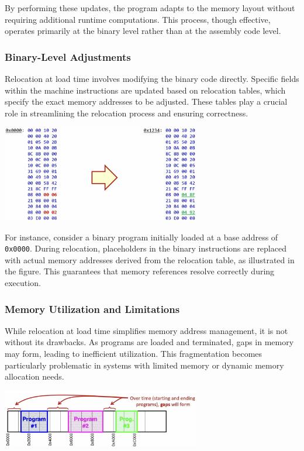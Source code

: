 By performing these updates, the program adapts to the memory layout without requiring additional runtime computations. This process, though effective, operates primarily at the binary level rather than at the assembly code level.

\subsubsection{Binary-Level Adjustments}

Relocation at load time involves modifying the binary code directly. Specific fields within the machine instructions are updated based on relocation tables, which specify the exact memory addresses to be adjusted. These tables play a crucial role in streamlining the relocation process and ensuring correctness.
\begin{center}
    \includegraphics[width=0.65\textwidth]{chapters/chapter3c/images/relocate2.png}
\end{center}

For instance, consider a binary program initially loaded at a base address of \texttt{0x0000}. During relocation, placeholders in the binary instructions are replaced with actual memory addresses derived from the relocation table, as illustrated in the figure. This guarantees that memory references resolve correctly during execution.

\subsubsection{Memory Utilization and Limitations}

While relocation at load time simplifies memory address management, it is not without its drawbacks. As programs are loaded and terminated, gaps in memory may form, leading to inefficient utilization. This fragmentation becomes particularly problematic in systems with limited memory or dynamic memory allocation needs.
\begin{center}
    \includegraphics[width=0.65\textwidth]{chapters/chapter3c/images/relocate3.png}
\end{center}

